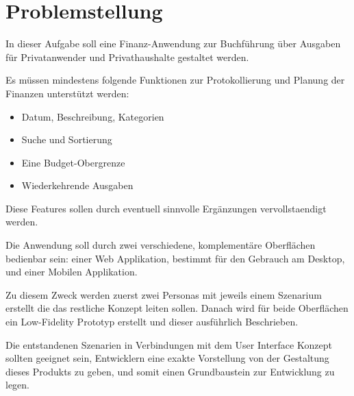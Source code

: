 \section{Problemstellung}

In dieser Aufgabe soll eine Finanz-Anwendung zur Buchf\"uhrung \"uber Ausgaben f\"ur
Privatanwender und Privathaushalte gestaltet werden.

Es m\"ussen mindestens folgende Funktionen zur Protokollierung und Planung der Finanzen
unterst\"utzt werden:

\begin{itemize}
\item Datum, Beschreibung, Kategorien
\item Suche und Sortierung
\item Eine Budget-Obergrenze
\item Wiederkehrende Ausgaben
\end{itemize}

Diese Features sollen durch eventuell sinnvolle Erg\"anzungen vervollstaendigt werden.

Die Anwendung soll durch zwei verschiedene, komplement\"are Oberfl\"achen bedienbar sein: einer Web Applikation,
bestimmt f\"ur den Gebrauch am Desktop, und einer Mobilen Applikation.

Zu diesem Zweck werden zuerst zwei Personas mit jeweils einem Szenarium erstellt die das
restliche Konzept leiten sollen. Danach wird f\"ur beide Oberfl\"achen ein Low-Fidelity Prototyp erstellt und dieser
ausf\"uhrlich Beschrieben.

Die entstandenen Szenarien in Verbindungen mit dem User Interface Konzept sollten geeignet sein,
Entwicklern eine exakte Vorstellung von der Gestaltung dieses Produkts zu geben, und somit einen Grundbaustein
zur Entwicklung zu legen.
